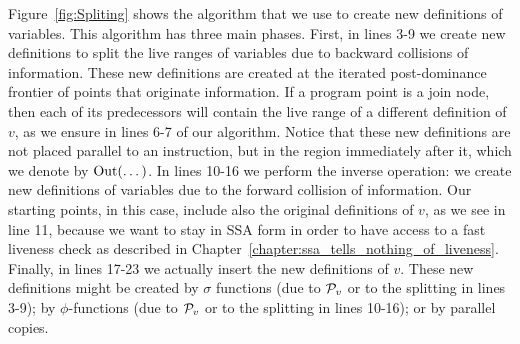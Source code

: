 Figure~\ref{fig:Spliting} shows the algorithm that we use to create new
definitions of variables.
This algorithm has three main phases.
First, in lines 3-9 we create new definitions to split the live ranges
of variables due to backward collisions of information.
These new definitions are created at the iterated post-dominance
frontier of points that originate information.
If a program point is a join node, then each of its predecessors
will contain the live range of a different definition of $v$, as we ensure
in lines 6-7 of our algorithm.
Notice that these new definitions are not placed parallel to an instruction,
but in the region immediately after it, which we denote by $\mathrm{Out}(\dots)$.
In lines 10-16 we perform the inverse operation: we create new definitions of
variables due to the forward collision of information.
Our starting points, in this case, include also the original definitions of
$v$, as we see in line 11, because we want to stay in SSA form in order to
have access to a fast liveness check as described in Chapter~\ref{chapter:ssa_tells_nothing_of_liveness}.
Finally, in lines 17-23 we actually insert the new definitions of $v$.
These new definitions might be created by $\sigma$ functions (due to ${\cal P}_v$ or
to the splitting in lines 3-9); by $\phi$-functions (due to ${\cal P}_v$ or to the
splitting in lines 10-16); or by parallel copies.

